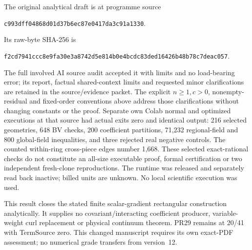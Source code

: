 The original analytical draft is at programme source
\begin{center}\scriptsize
\texttt{c993dff04868d01d37b6ec87e0417da3c91a1330}.
\end{center}
Its raw-byte SHA-256 is
\begin{center}\scriptsize
\texttt{f2cd7941ccc8e9fa30e3a8742d5e814b0e4bcdc83ded16426b48b78c7deac057}.
\end{center}
The full involved AI source audit accepted it with limits and no load-bearing
error; its report, factual shared-context limits and requested minor
clarifications are retained in the source/evidence packet. The explicit
$n\ge1,c>0$, nonempty-residual and fixed-order conventions above address
those clarifications without changing constants or the proof.
Separate own Colab normal and optimized executions at that source had
actual exits zero and identical output: 216 selected geometries,
648 BV checks, 200 coefficient partitions, 71,232 regional-field and
800 global-field inequalities, and three rejected real negative controls.
The counted within-ring cross-piece edges number 1,668. These selected
exact-rational checks do not constitute an all-size executable proof,
formal certification or two independent fresh-clone reproductions.
The runtime was released and separately read back inactive; billed units
are unknown. No local scientific execution was used.

This result closes the stated finite scalar-gradient rectangular
construction analytically. It supplies no covariant/interacting coefficient
producer, variable-weight curl replacement or physical continuum theorem.
PR29 remains at 20/41 with TermSource zero. This changed manuscript requires
its own exact-PDF assessment; no numerical grade transfers from version~12.
